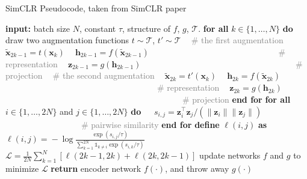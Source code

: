 \documentclass{article}
\begin{document}
\begin{algorithm}[h]
\begin{algorithmic}[1]
\caption{SimCLR Pseudocode, taken from SimCLR paper~\cite{DBLP:journals/corr/abs-2002-05709}}
    \State \textbf{input:} batch size $N$, constant $\tau$, structure of $f$, $g$, $\mathcal{T}$.
    \State \textbf{for all} $k\in \{1, \ldots, N\}$ \textbf{do}
        \State $~~~~$draw two augmentation functions $t \!\sim\! \mathcal{T}$, $t' \!\sim\! \mathcal{T}$
        \State $~~~~$\textcolor{gray}{\# the first augmentation} 
        \State $~~~~$$\tilde{\bm x}_{2k-1} = t(\bm x_k)$
        \State $~~~~$$\bm h_{2k-1} = f(\tilde{\bm x}_{2k-1})$  \textcolor{gray}{~~~~~~~~~~~~~~~~~~~~~~~~~~~~~~\# representation}
        \State $~~~~$$\bm z_{2k-1} = g({\bm h}_{2k-1})$  \textcolor{gray}{~~~~~~~~~~~~~~~~~~~~~~~~~~~~~~~~~~~~\# projection}
        \State $~~~~$\textcolor{gray}{\# the second augmentation} 
        \State $~~~~$$\tilde{\bm x}_{2k} = t'(\bm x_k)$
        \State $~~~~$$\bm h_{2k} = f(\tilde{\bm x}_{2k})$      \textcolor{gray}{~~~~~~~~~~~~~~~~~~~~~~~~~~~~~~~~~~~~\# representation}
        \State $~~~~$$\bm z_{2k} = g({\bm h}_{2k})$      \textcolor{gray}{~~~~~~~~~~~~~~~~~~~~~~~~~~~~~~~~~~~~~~~~~~\# projection}
    \State \textbf{end for}
    \State \textbf{for all} $i\in\{1, \ldots, 2N\}$ and $j\in\{1, \dots, 2N\}$ \textbf{do}
    \State $~~~~$ $s_{i,j} = \bm z_i^\top \bm z_j / (\lVert\bm z_i\rVert \lVert\bm z_j\rVert)$ \textcolor{gray}{~~~~~~~~~~~~~~~~~~\# pairwise similarity}
    \State \textbf{end for}
    \State \textbf{define} $\ell(i, j)$ \textbf{as}~ $\ell(i, j) \!=\! -\log \frac{\exp(s_{i,j}/\tau)}{\sum_{k=1}^{2N} \mathds{1}_{k \neq i}\exp(s_{i, k}/\tau)}$
    \State $\mathcal{L} = \frac{1}{2N} \sum_{k=1}^N \left[ \ell(2k\!-\!1, 2k) + \ell(2k, 2k\!-\!1)\right]$
    \State update networks $f$ and $g$ to minimize $\mathcal{L}$
    \EndFor
    \State \textbf{return} encoder network $f(\cdot)$, and throw away $g(\cdot)$
\end{algorithmic}
\end{algorithm}
\end{document}
